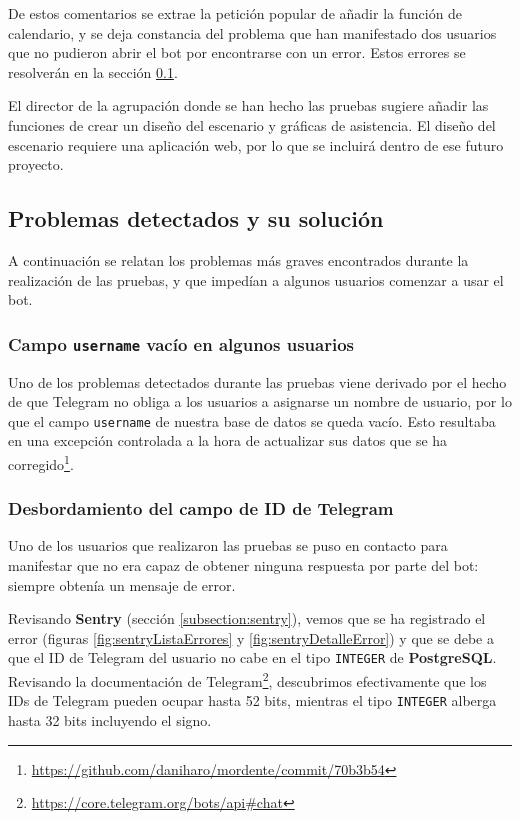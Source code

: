 De estos comentarios se extrae la petición popular de añadir la función de calendario, y se deja constancia del problema que han manifestado dos usuarios que no pudieron abrir el bot por encontrarse con un error. Estos errores se resolverán en la sección \ref{subsection:pruebasSoluciones}.

El director de la agrupación donde se han hecho las pruebas sugiere añadir las funciones de crear un diseño del escenario y gráficas de asistencia. El diseño del escenario requiere una aplicación web, por lo que se incluirá dentro de ese futuro proyecto.

\subsection{Problemas detectados y su solución}\label{subsection:pruebasSoluciones}

A continuación se relatan los problemas más graves encontrados durante la realización de las pruebas, y que impedían a algunos usuarios comenzar a usar el bot.

\subsubsection{Campo \texttt{username} vacío en algunos usuarios}

Uno de los problemas detectados durante las pruebas viene derivado por el hecho de que Telegram no obliga a los usuarios a asignarse un nombre de usuario, por lo que el campo \texttt{username} de nuestra base de datos se queda vacío. Esto resultaba en una excepción controlada a la hora de actualizar sus datos que se ha corregido\footnote{\url{https://github.com/daniharo/mordente/commit/70b3b54}}.

\subsubsection{Desbordamiento del campo de ID de Telegram}

Uno de los usuarios que realizaron las pruebas se puso en contacto para manifestar que no era capaz de obtener ninguna respuesta por parte del bot: siempre obtenía un mensaje de error.

Revisando \textbf{Sentry} (sección \ref{subsection:sentry}), vemos que se ha registrado el error (figuras \ref{fig:sentryListaErrores} y \ref{fig:sentryDetalleError}) y que se debe a que el ID de Telegram del usuario no cabe en el tipo \texttt{INTEGER} de \textbf{PostgreSQL}. Revisando la documentación de Telegram\footnote{\url{https://core.telegram.org/bots/api\#chat}}, descubrimos efectivamente que los IDs de Telegram pueden ocupar hasta 52 bits, mientras el tipo \texttt{INTEGER} alberga hasta 32 bits incluyendo el signo.

